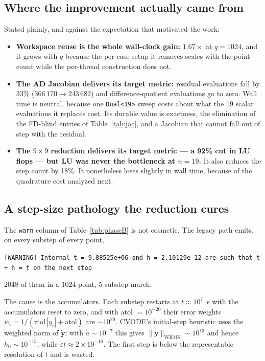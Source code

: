 \documentclass[11pt,a4paper]{article}
\newcommand{\code}[1]{\texttt{\small #1}}
\begin{document}
\subsection{Where the improvement actually came from}

Stated plainly, and against the expectation that motivated the work:

\begin{itemize}
\item \textbf{Workspace reuse is the whole wall-clock gain:} $1.67\times$ at
      $q=1024$, and it grows with $q$ because the per-case setup it removes
      scales with the point count while the per-thread construction does not.
\item \textbf{The AD Jacobian delivers its target metric:} residual evaluations
      fall by 33\% ($366\,170\to243\,682$) and difference-quotient evaluations
      go to zero. Wall time is neutral, because one \code{Dual<19>} sweep costs
      about what the 19 scalar evaluations it replaces cost. Its durable value
      is exactness, the elimination of the FD-blind entries of
      Table~\ref{tab:jac}, and a Jacobian that cannot fall out of step with the
      residual.
\item \textbf{The $9\times9$ reduction delivers its target metric --- a 92\%
      cut in LU flops --- but LU was never the bottleneck at $n=19$.} It also
      reduces the step count by 18\%. It nonetheless loses slightly in wall
      time, because of the quadrature cost analyzed next.
\end{itemize}

\subsection{A step-size pathology the reduction cures}
\label{sec:pathology}

The \code{warn} column of Table~\ref{tab:phaseB} is not cosmetic. The legacy
path emits, on every substep of every point,
\begin{center}
\code{[WARNING] Internal t = 9.88525e+06 and h = 2.10129e-12 are such that
      t + h = t on the next step}
\end{center}
2048 of them in a 1024-point, 5-substep march.

The cause is the accumulators. Each substep restarts at $t\approx10^{7}$~s with
the accumulators reset to zero, and with atol $=10^{-20}$ their error weights
$w_i=1/(\mathrm{rtol}\,|y_i|+\mathrm{atol})$ are ${\sim}10^{20}$. CVODE's
initial-step heuristic uses the weighted norm of $\dot{\mathbf y}$; with
$\dot a\sim10^{-7}$ this gives $\|\dot{\mathbf y}\|_{\mathrm{WRMS}}\sim10^{13}$
and hence $h_0\sim10^{-13}$, while $\varepsilon t\approx2\times10^{-10}$. The
first step is below the representable resolution of $t$ and is wasted.
\end{document}
